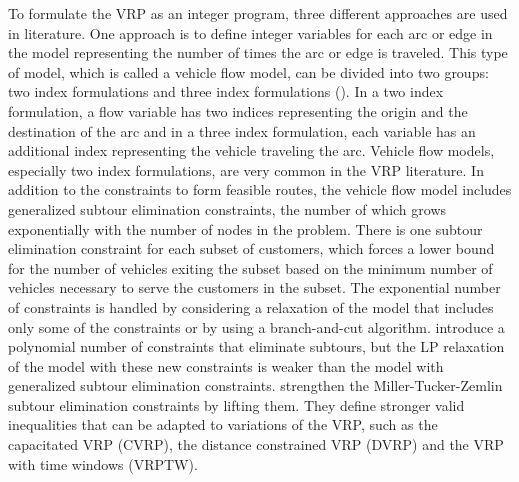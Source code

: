 To formulate the VRP as an integer program, three different approaches are used in 
literature. One approach is to define integer variables for each arc or edge in the 
model representing the number of times the arc or edge is traveled. This type of 
model, which is called a vehicle flow model, can be divided into two groups: 
two index formulations and three index formulations (\citet{Laporte2}). In a 
two index formulation, a flow variable has two indices representing the 
origin and the destination of the arc and in a three index formulation,
each variable has an additional index representing the vehicle traveling the arc.  
Vehicle flow models, especially two index formulations, are very common in the 
VRP literature. 
In addition to the constraints to form feasible routes, the vehicle 
flow model includes generalized subtour elimination constraints, the number of which 
grows exponentially with the number of nodes in the problem. There is one subtour 
elimination constraint for each subset of customers, which forces a lower bound for 
the number of vehicles exiting the subset based on the minimum number of vehicles 
necessary to serve the customers in the subset. The exponential number of constraints 
is handled by considering a relaxation of the model that includes only some of the 
constraints or by using a branch-and-cut algorithm. \citet*{Miller} introduce a 
polynomial number of constraints that eliminate subtours, but the LP relaxation of the 
model with these new constraints is weaker than the model with generalized subtour 
elimination constraints. \citet{Desrochers3} strengthen the Miller-Tucker-Zemlin 
subtour elimination constraints by lifting them. They define stronger valid 
inequalities that can be adapted to variations of the VRP, such as the capacitated 
VRP (CVRP), the distance constrained VRP (DVRP) and the VRP with time windows (VRPTW).    
  
